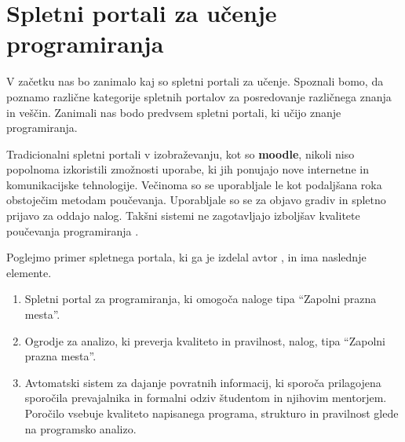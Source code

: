 \section{Spletni portali za učenje programiranja}
\label{sec:SPUP}


V začetku nas bo zanimalo kaj so spletni portali za učenje. Spoznali
bomo, da poznamo različne kategorije spletnih portalov za posredovanje
različnega znanja in veščin. Zanimali nas bodo  predvsem spletni
portali, ki učijo znanje programiranja.

Tradicionalni spletni portali v izobraževanju, kot so \textbf{moodle},
nikoli niso popolnoma izkoristili zmožnosti uporabe, ki jih ponujajo
nove internetne in komunikacijske tehnologije. Večinoma so se
uporabljale le kot podaljšana roka obstoječim metodam
poučevanja. Uporabljale so se za objavo gradiv in spletno prijavo za
oddajo nalog. Takšni sistemi ne zagotavljajo izboljšav kvalitete
poučevanja programiranja \cite{ITaLCP_DistanceEdu}.


Poglejmo primer spletnega portala, ki ga je izdelal avtor
\cite{thesisAWebP}, in ima naslednje elemente.

\begin{enumerate}
\def\labelenumi{\arabic{enumi}.}
\item
  Spletni portal za programiranja, ki omogoča naloge tipa ``Zapolni
  prazna mesta''.
\item
  Ogrodje za analizo, ki preverja kvaliteto in pravilnost, nalog, tipa
  ``Zapolni prazna mesta''.
\item
  Avtomatski sistem za dajanje povratnih informacij, ki sporoča
  prilagojena sporočila prevajalnika in formalni odziv študentom in
  njihovim mentorjem. Poročilo vsebuje kvaliteto napisanega programa,
  strukturo in pravilnost glede na programsko analizo.
\end{enumerate}

